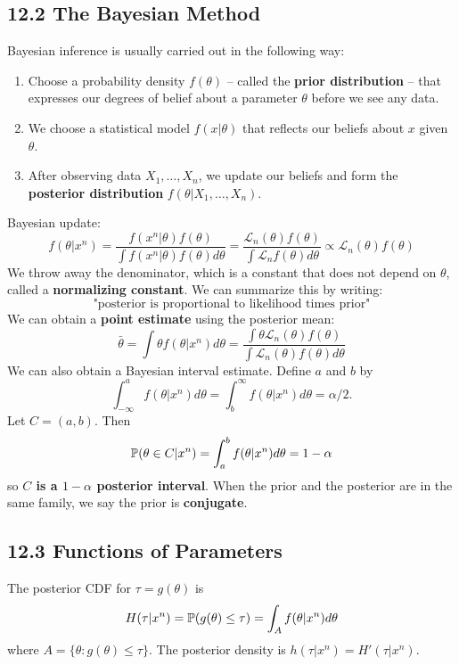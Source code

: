 \subsection*{12.2 The Bayesian Method}\label{the-bayesian-method}
Bayesian inference is usually carried out in the following way:
\begin{enumerate}[label={\arabic*.}]
\item
  Choose a probability density \(f(\theta)\) -- called the \textbf{prior
  distribution} -- that expresses our degrees of belief about a
  parameter \(\theta\) before we see any data.
\item
  We choose a statistical model \(f(x | \theta)\) that reflects our
  beliefs about \(x\) given \(\theta\).
\item
  After observing data \(X_{1}, \dots, X_{n}\), we update our beliefs and
  form the \textbf{posterior distribution}
  \(f(\theta | X_{1}, \dots, X_{n})\).
\end{enumerate}
Bayesian update:
\[
f(\theta | x^{n}) = \frac{f(x^{n} | \theta) f(\theta)}{\int f(x^{n} | \theta) f(\theta) d\theta} 
= \frac{\mathcal{L}_{n}(\theta) f(\theta)}{\int \mathcal{L}_{n} f(\theta) d\theta}
\propto \mathcal{L}_{n}(\theta) f(\theta)
\]
We throw away the denominator, which is a constant that does not depend
on \(\theta\), called a \textbf{normalizing constant}. We can summarize
this by writing:
\[
\text{"posterior is proportional to likelihood times prior"}
\]
We can obtain a \textbf{point estimate} using the posterior mean:
\[
\bar{\theta} = \int \theta f(\theta | x^{n}) d\theta = \frac{\int \theta \mathcal{L}_{n}(\theta) f(\theta)}{\int \mathcal{L}_{n}(\theta) f(\theta) d\theta}
\]
We can also obtain a Bayesian interval estimate. Define \(a\) and \(b\)
by 
\[
\int_{-\infty}^{a} f(\theta | x^{n}) d\theta =
\int_{b}^{\infty} f(\theta | x^{n}) d\theta = \alpha / 2.
\]
Let \(C = (a, b)\). Then
\[
\operatorname{\mathbb{P}}(\theta \in C | x^{n}) = \int_a^{b} f(\theta | x^{n}) d\theta = 1 - \alpha
\]
so \textbf{\(C\) is a \(1 - \alpha\) posterior interval}.
When the prior and the posterior are in the same family, we say the
prior is \textbf{conjugate}.

\subsection*{12.3 Functions of
Parameters}\label{functions-of-parameters}
The posterior CDF for \(\tau = g(\theta)\) is
\[
H(\tau | x^{n}) = \operatorname{\mathbb{P}}(g(\theta) \leq \tau) = \int_A f(\theta | x^{n}) d\theta
\]
where \(A = \{ \theta : g(\theta) \leq \tau \}\). The posterior density
is \(h(\tau | x^{n}) = H'(\tau | x^{n})\).

